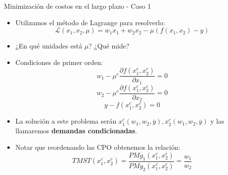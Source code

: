 \documentclass{beamer}
\theoremstyle{definition}
\begin{document}
		\begin{frame}{Minimización de costos en el largo plazo  - Caso 1} \small
		\begin{itemize}
		
		\item Utilizamos el m\'etodo de Lagrange para resolverlo:
		\begin{equation*}
		\mathcal{L}(x_{1},x_{2},\mu)=w_{1}x_{1}+w_{2}x_{2}-\mu(f(x_{1},x_{2})-y)
		\end{equation*}
		\item ¿En qué unidades está $\mu$? ¿Qué mide?
				\item Condiciones de primer orden:
		\begin{equation*}
		w_{1}-\mu^{c}\frac{\partial f(x^{c}_{1},x^{c}_{2})}{\partial x_{1}}=0
		\end{equation*}
		\begin{equation*}
		w_{2}-\mu^{c}\frac{\partial f(x^{c}_{1},x^{c}_{2})}{\partial x_{2}}=0
		\end{equation*}
		\begin{equation*}
		y-f(x^{c}_{1},x^{c}_{2})=0
		\end{equation*}
	

		\item La soluci\'on a este problema ser\'an  $x^{c}_{1}(w_{1},w_{2},\overline{y}), x^{c}_{2}(w_{1},w_{2},\overline{y})$ y las llamaremos \textbf{demandas condicionadas}. 
		\item Notar que reordenando las CPO obtenemos la relaci\'on:
		\begin{equation*}
			TMST(x_{1}^c,x_{2}^c)=\frac{PMg_{1}(x^{c}_{1},x^{c}_{2})}{	PMg_{2}(x^{c}_{1},x^{c}_{2})}=\frac{w_{1}}{w_{2}}
		\end{equation*}
	
	\end{itemize}
\end{frame}	
\end{document}
